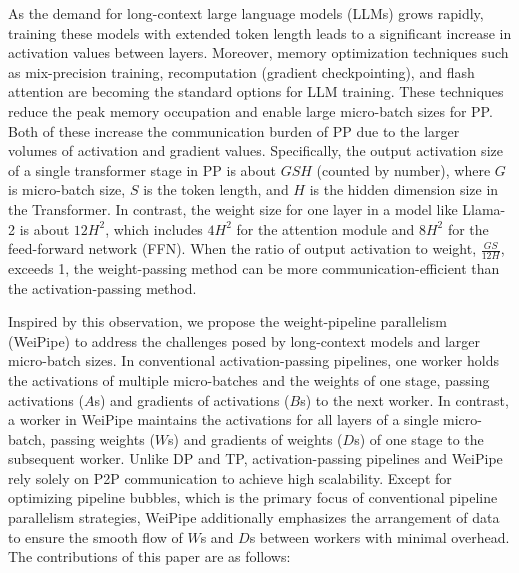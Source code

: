 \documentclass[sigplan,review,anonymous]{acmart}
\begin{document}
As the demand for long-context large language models (LLMs) grows rapidly, training these models with extended token length leads to a significant increase in activation values between layers. Moreover, memory optimization techniques such as mix-precision training\cite{micikevicius2018mixedprecisiontraining}, recomputation (gradient checkpointing), and flash attention are becoming the standard options for LLM training. These techniques reduce the peak memory occupation and enable large micro-batch sizes for PP. Both of these increase the communication burden of PP due to the larger volumes of activation and gradient values. Specifically, the output activation size of a single transformer stage in PP is about $GSH$ (counted by number), where $G$ is micro-batch size, $S$ is the token length, and $H$ is the hidden dimension size in the Transformer. In contrast, the weight size for one layer in a model like Llama-2 is about $12H^2$, which includes $4H^2$ for the attention module and $8H^2$ for the feed-forward network (FFN). When the ratio of output activation to weight, $\frac{GS}{12H}$, exceeds 1, the weight-passing method can be more communication-efficient than the activation-passing method.

Inspired by this observation, we propose the weight-pipeline parallelism (WeiPipe) to address the challenges posed by long-context models and larger micro-batch sizes. In conventional activation-passing pipelines, one worker holds the activations of multiple micro-batches and the weights of one stage, passing activations ($A$s) and gradients of activations ($B$s) to the next worker. In contrast, a worker in WeiPipe maintains the activations for all layers of a single micro-batch, passing weights ($W$s) and gradients of weights ($D$s) of one stage to the subsequent worker. Unlike DP and TP, activation-passing pipelines and WeiPipe rely solely on P2P communication to achieve high scalability. Except for optimizing pipeline bubbles, which is the primary focus of conventional pipeline parallelism strategies, WeiPipe additionally emphasizes the arrangement of data to ensure the smooth flow of $W$s and $D$s between workers with minimal overhead. The contributions of this paper are as follows:
\end{document}
